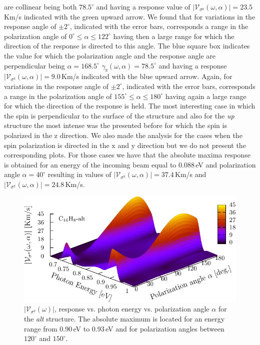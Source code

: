 \documentclass[prb,11pt,tightenlines,twocolumn,aps]{revtex4-1}
\begin{document}
are collinear being both $78.5^{\circ}$ and having a response value of
$|\mathcal{V}_{\sigma^{\mathrm{z}}}(\omega,\alpha)|=23.5$\,Km/s indicated with
the green upward arrow. We found that for variations in the response angle of
$\pm 2^{\circ}$, indicated with the error bars, corresponds a range in the
polarization angle of $0^{\circ} \leq \alpha \leq 122^{\circ}$ having then a
large range for which the direction of the response is directed to this angle.
% 
The blue square box indicates the value for which the polarization angle and the
response angle are perpendicular being $\alpha=168.5^{\circ}$
$\gamma_{\mathrm{z}}(\omega,\alpha)=78.5^{\circ}$ and having a response
$|\mathcal{V}_{\sigma^{\mathrm{z}}}(\omega,\alpha)|=9.0$\,Km/s indicated with
the blue upward arrow. Again, for variations in the response angle of
$\pm2^{\circ}$, indicated with the error bars, corresponds a range in the
polarization angle of $155^{\circ} \leq \alpha \leq 180^{\circ}$ having again a
large range for which the direction of the response is held.
% 
% 
The most interesting case in which the spin is perpendicular to the surface of
the structure and also for the \emph{up} structure the most intense was the
presented before for which the spin is polarized in the $\mathrm{z}$ direction.
We also made the analysis for the cases when the spin polarization is directed
in the $\mathrm{x}$ and $\mathrm{y}$ direction but we do not present the
corresponding plots. For those cases we have that the absolute maxima response
is obtained for an energy of the incoming beam equal to 0.088\,eV and
polarization angle $\alpha=40^{\circ}$ resulting in values of
$|\mathcal{V}_{\sigma^{\mathrm{x}}}(\omega,\alpha)|=37.4$\,Km/s and
$|\mathcal{V}_{\sigma^{\mathrm{y}}}(\omega,\alpha)|=24.8$\,Km/s.



\begin{figure}[tb]
    \centering
    \includegraphics[width=\linewidth]{altplots/alt-3d-svaz}
    \caption{$|\mathcal{V}_{\sigma^{\mathrm{z}}}(\omega)|$, response
    vs. photon energy vs. polarization angle $\alpha$ for the \emph{alt}
    structure. The absolute maximum is located for an energy range from 0.90\,eV
    to 0.93\,eV and for polarization angles between $120^{\circ}$ and
    $150^{\circ}$.}
    \label{fig:alt-3d-vsb}
\end{figure}
\end{document}
